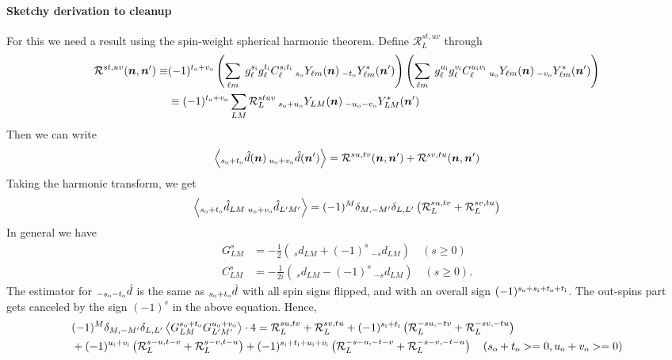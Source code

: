 \documentclass[reprint,prd, superscriptaddress, tightenlines, longbibliography, nofootinbib, eqsecnum, amsfonts, amsmath, floatfix, notitlepage, onecolumn]{revtex4-1}
\newcommand{\si}[0]{{s_{\rm i}}}
\newcommand{\ti}[0]{{t_{\rm i}}}
\newcommand{\ui}[0]{{u_{\rm i}}}
\newcommand{\vi}[0]{{v_{\rm i}}}
\newcommand{\so}[0]{{s_{\rm o}}}
\renewcommand{\to}[0]{{t_{\rm o}}}
\newcommand{\uo}[0]{{u_{\rm o}}}
\newcommand{\vo}[0]{{v_{\rm o}}}
\newcommand{\Ylm}[1]{\:_{#1}Y_{\ell m}}
\newcommand{\Ylms}[1]{\:_{#1}Y^*_{\ell m}}
\newcommand{\YLM}[1]{\:_{#1}Y_{L M}}
\newcommand{\YLMs}[1]{\:_{#1}Y^*_{L M}}
\newcommand{\av}[1]{\left\langle #1 \right\rangle}
\newcommand{\hn}[0]{\boldsymbol{n}}
\begin{document}
\paragraph{Sketchy derivation to cleanup}
For this we need a result using the spin-weight spherical harmonic theorem.
Define $\mathcal R^{st,uv}_L $ through
\begin{equation}
\begin{split}
\mathcal R^{st,uv}(\hn, \hn') \equiv	& (-1)^{\to + \vo}\left(\sum_{\ell m}\: g^{\si}_\ell g^{\ti}_\ell C_\ell^{\si \ti} \Ylm \so(\hn)   \Ylms {-\to}  (\hn')\right) \left(\sum_{\ell m}\: g^{\ui}_\ell g^{\vi}_\ell C_\ell^{\ui \vi} \Ylm \uo(\hn)   \Ylms {-\vo} (\hn')\right) \\ &\equiv (-1)^{\to + \vo} \sum_{LM} \mathcal R^{stuv}_L  \YLM{\so + \uo}(\hn)   \YLMs {-\uo - \vo} (\hn')
\end{split}
\end{equation}
Then we can write
\begin{equation}
\begin{split}
	\av{ _{\so + \to}\hat d(\hn)\: _{\uo + \vo}\hat d(\hn')} =\mathcal R^{su,tv}(\hn, \hn') + \mathcal R^{sv,tu}(\hn, \hn')
\end{split}
\end{equation}
Taking the harmonic transform, we get
\begin{equation}
	\av{ _{\so + \to}\hat d_{LM} \:_{\uo + \vo}\hat d_{L'M'}} = (-1)^M\delta_{M, -M'}\delta_{L,L'}\left(\mathcal R^{su, tv}_L + \mathcal R^{sv, tu}_L\right)
\end{equation}
In general we have
\begin{eqnarray*}
		G^{s}_{LM} &= -\frac 12\left(\:_s d_{LM} + (-1)^s \:_{-s} d_{LM}\right) \quad (s \geq 0) \\
		C^{s}_{LM} &=-\frac 1{2i} \left( \:_s d_{LM} - (-1)^s \:_{-s} d_{LM} \right) \quad (s \geq 0).
\end{eqnarray*}
The estimator for $_{-\so - \to}\hat d$ is the same as $_{\so + \to}\hat d$ with all spin signs flipped, and with an overall sign $(-1)^{\so + \si + \to + \ti}$. The out-spins part gets canceled by the sign $(-1)^s$ in the above equation.
Hence,
\begin{equation}
\begin{split}
			&(-1)^M\delta_{M, -M'}\delta_{L,L'}\av{G^{\so + \to}_{LM} G^{\uo + \vo}_{L'M'} }\cdot 4 =\mathcal R^{su, tv}_L + \mathcal R^{sv, tu}_L + (-1)^{\si + \ti}\left(\mathcal R^{-su, -tv}_L + \mathcal R_L^{-sv, -tu} \right) \\&+ (-1)^{\ui + \vi}\left(\mathcal R^{s-u, t-v}_L + \mathcal R_L^{s-v, t-u}\right) + (-1)^{\si + \ti + \ui + \vi}\left(\mathcal R^{-s-u, -t-v}_L + \mathcal R_L^{-s-v, -t-u}\right)\quad (\so + \to >= 0, \uo + \vo >= 0)
\end{split}
\end{equation}
\end{document}
